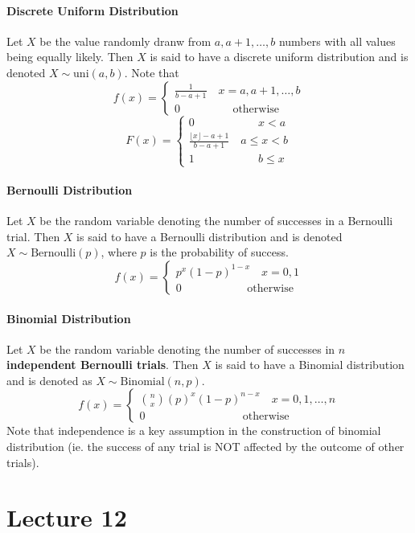 \documentclass[10pt,letter]{article}
\begin{document}
\paragraph{Discrete Uniform Distribution}
Let $X$ be the value randomly dranw from $a,a+1,\ldots,b$ numbers with all values being equally likely. Then $X$ is said to have a discrete uniform distribution and is denoted $X\sim\text{uni}(a,b)$. Note that $$f(x)=\begin{cases}\frac{1}{b-a+1}\quad x=a,a+1,\ldots,b\\0\quad\quad\quad\,\,\,\,\quad \text{otherwise}\end{cases}$$ $$F(x)=\begin{cases}0\quad\quad\quad\quad\quad\,\,\,\, x<a\\\frac{\lfloor x\rfloor-a+1}{b-a+1}\quad a\leq x<b\\1\quad\quad\quad\quad\quad\,\,\,\, b\leq x\end{cases} $$

\paragraph{Bernoulli Distribution}
Let $X$ be the random variable denoting the number of successes in a Bernoulli trial. Then $X$ is said to have a Bernoulli distribution and is denoted $X\sim\text{Bernoulli}(p)$, where $p$ is the probability of success. $$f(x)=\begin{cases}p^x(1-p)^{1-x}\quad x=0,1\\0\quad\quad\quad\quad\,\,\,\,\,\quad\text{otherwise}\end{cases}$$ 

\paragraph{Binomial Distribution}
Let $X$ be the random variable denoting the number of successes in \textbf{$n$ independent Bernoulli trials}. Then $X$ is said to have a Binomial distribution and is denoted as $X\sim\text{Binomial}(n,p)$. $$f(x)=\begin{cases}{n\choose x}(p)^x(1-p)^{n-x}\quad x=0,1,\ldots,n\\0\quad\quad\quad\quad\quad\quad\quad\quad\,\,\,\,\text{otherwise}\end{cases}$$ Note that independence is a key assumption in the construction of binomial distribution (ie. the success of any trial is NOT affected by the outcome of other trials). 


\section*{Lecture 12}
\end{document}
